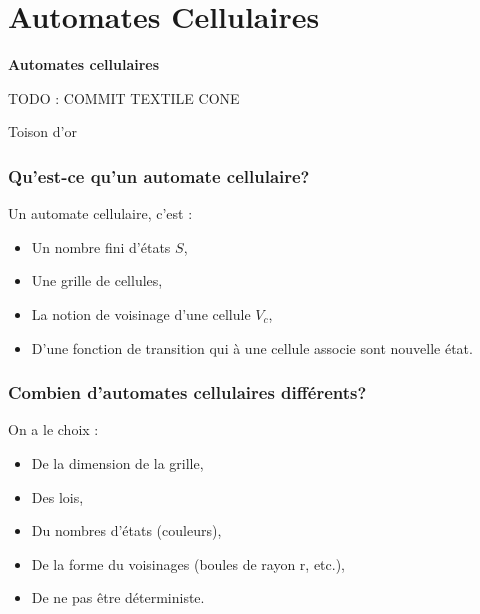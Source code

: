\documentclass{beamer}
\begin{document}
\section{Automates Cellulaires}
\begin{frame}
\begin{center}
\textbf{Automates cellulaires}
\end{center}

\begin{center}
TODO : COMMIT TEXTILE CONE
\end{center}

\begin{center}Toison d'or\end{center}

\end{frame}

\begin{frame}
\frametitle{Qu'est-ce qu'un automate cellulaire?}
\begin{block}{Un automate cellulaire, c'est :}
	\begin{itemize}
		\item Un nombre fini d'états $S$,
		\item Une grille de cellules,
		\item La notion de voisinage d'une cellule $V_c$,
		\item D'une fonction de transition qui à une cellule associe sont nouvelle état.
	\end{itemize}
\end{block}
\end{frame}

\begin{frame}
\frametitle{Combien d'automates cellulaires différents?}
\begin{block}{On a le choix :}
	\begin{itemize}
	\item De la dimension de la grille,
	\item Des lois,
	\item Du nombres d'états (couleurs),
	\item De la forme du voisinages (boules de rayon r, etc.),
	\item De ne pas être déterministe.
	\end{itemize}
\end{block}
\end{frame}
\end{document}
